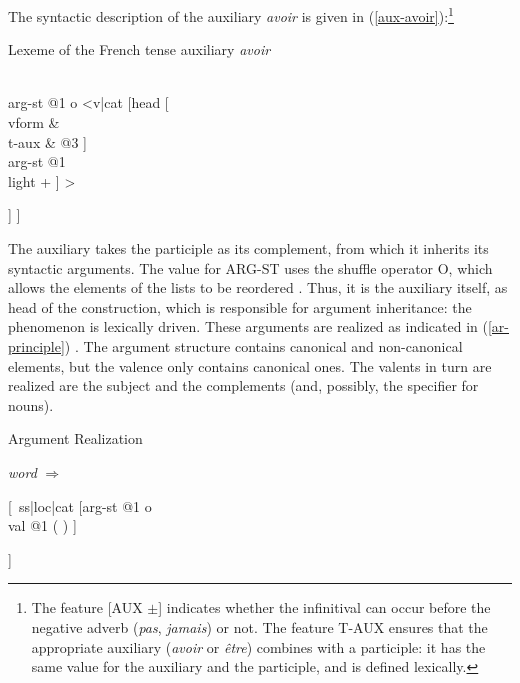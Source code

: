 \documentclass[output=paper]{langsci/langscibook}
\begin{document}
The syntactic description of the auxiliary \textit{avoir} is given in (\ref{aux-avoir}):\footnote{The feature [AUX $±$] indicates whether the infinitival can occur before the negative adverb (\textit{pas}, \textit{jamais}) or not. The feature T-AUX ensures that the appropriate auxiliary (\textit{avoir} or \textit{\^etre}) combines with a participle: it has the same value for the auxiliary and the participle, and is defined lexically.}



\begin{exe}
	\ex \label{aux-avoir} Lexeme of the French tense auxiliary \textit{avoir} 
	
	
	\begin{avm}
		[{ } cat & [{ } head  [{} \normalfont{\textit{verb}} \\
		t-aux & @3  \\
		aux   & + ]
		\\
		arg-st    @1   o <v|cat [{}head [{}\\
		vform & \\
		t-aux  & @3
		]\\
		arg-st  @1\\
		light +          
		] >		
		
		]
		]		
	\end{avm}
	
	
\end{exe}



The auxiliary takes the participle as its complement, from which it inherits its syntactic arguments. The value for ARG-ST uses the shuffle operator O, which allows the elements of the lists to be reordered \citep{Reape94-ohne-crossref}. Thus, it is the auxiliary itself, as head of the construction, which is responsible for argument inheritance: the phenomenon is lexically driven. These arguments are realized as indicated in (\ref{ar-principle}) \citep[see][for the Argument Realization Principle]{GSag2000a-u}. The argument structure contains canonical and non-canonical elements, but the valence only contains canonical ones. The valents in turn are realized are the subject and the complements (and, possibly, the specifier for nouns).


\begin{exe}
	\ex \label{ar-principle}  Argument Realization \citep{BS2015a-u}
	
	\textit{word}  $\Rightarrow$ \begin{avm}
		
		[{} ss|loc|cat [{}arg-st @1 o \\
		val    @1 ( )
		]
		
		]
		
	\end{avm}
	
\end{exe}
\end{document}
